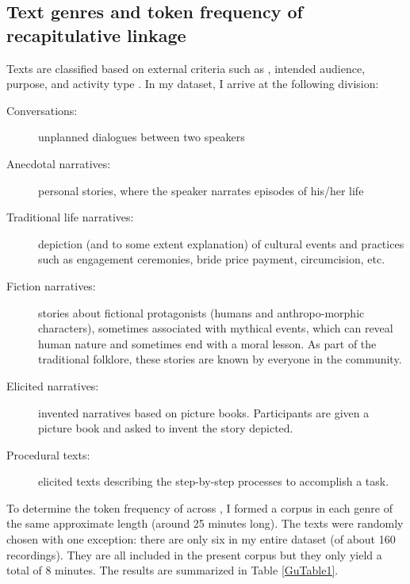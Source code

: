 \documentclass[output=paper]{LSP/langsci}
\begin{document}
\subsection{Text genres and token frequency of recapitulative linkage} 
\label{Gusec:frequency}
Texts are classified based on external criteria such as , intended audience,
\noindent
purpose, and activity type \citep[][38]{lee01}. In my  dataset, I arrive at the following division: 

\begin{description}
\item[Conversations:] unplanned dialogues between two speakers
\item[Anecdotal narratives:] personal stories, where the speaker narrates episodes of his/her life
\item[Traditional life narratives:] depiction (and to some extent explanation) of cultural events and practices such as engagement ceremonies, bride price payment, circumcision, etc.
\item[Fiction narratives:] stories about fictional protagonists (humans and anthropo-\linebreak morphic characters), sometimes associated with mythical events, which can reveal human nature and sometimes end with a moral lesson. As part of the traditional folklore, these stories are known by everyone in the community.
\item[Elicited narratives:] invented narratives based on picture books. Participants are given a picture book and asked to invent the story depicted.
\item[Procedural texts:] elicited texts describing the step-by-step processes to accomplish a task. 
\end{description}

To determine the token frequency of  across , I formed a corpus in each genre of the same approximate length (around 25 minutes long). The texts were randomly chosen with one exception: there are only six  in my entire dataset (of about 160 recordings). They are all included in the present corpus but they only yield a total of 8 minutes. The results are summarized in Table \ref{GuTable1}.  
\end{document}
